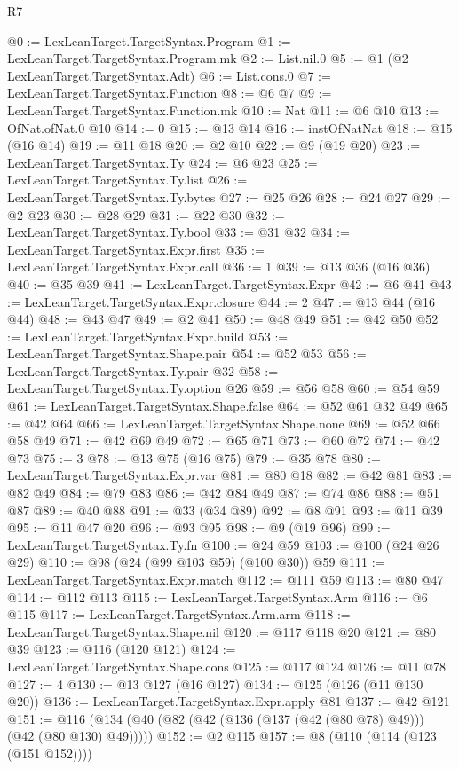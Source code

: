 \begin{lexlean}{R7}
\begin{coremodule}
{{{{{{{{{{{{{@0 := LexLeanTarget.TargetSyntax.Program
@1 := LexLeanTarget.TargetSyntax.Program.mk
@2 := List.nil.{0}
@5 := @1 (@2 LexLeanTarget.TargetSyntax.Adt)
@6 := List.cons.{0}
@7 := LexLeanTarget.TargetSyntax.Function
@8 := @6 @7
@9 := LexLeanTarget.TargetSyntax.Function.mk
@10 := Nat
@11 := @6 @10
@13 := OfNat.ofNat.{0} @10
@14 := 0
@15 := @13 @14
@16 := instOfNatNat
@18 := @15 (@16 @14)
@19 := @11 @18
@20 := @2 @10
@22 := @9 (@19 @20)
@23 := LexLeanTarget.TargetSyntax.Ty
@24 := @6 @23
@25 := LexLeanTarget.TargetSyntax.Ty.list
@26 := LexLeanTarget.TargetSyntax.Ty.bytes
@27 := @25 @26
@28 := @24 @27
@29 := @2 @23
@30 := @28 @29
@31 := @22 @30
@32 := LexLeanTarget.TargetSyntax.Ty.bool
@33 := @31 @32
@34 := LexLeanTarget.TargetSyntax.Expr.first
@35 := LexLeanTarget.TargetSyntax.Expr.call
@36 := 1
@39 := @13 @36 (@16 @36)
@40 := @35 @39
@41 := LexLeanTarget.TargetSyntax.Expr
@42 := @6 @41
@43 := LexLeanTarget.TargetSyntax.Expr.closure
@44 := 2
@47 := @13 @44 (@16 @44)
@48 := @43 @47
@49 := @2 @41
@50 := @48 @49
@51 := @42 @50
@52 := LexLeanTarget.TargetSyntax.Expr.build
@53 := LexLeanTarget.TargetSyntax.Shape.pair
@54 := @52 @53
@56 := LexLeanTarget.TargetSyntax.Ty.pair @32
@58 := LexLeanTarget.TargetSyntax.Ty.option @26
@59 := @56 @58
@60 := @54 @59
@61 := LexLeanTarget.TargetSyntax.Shape.false
@64 := @52 @61 @32 @49
@65 := @42 @64
@66 := LexLeanTarget.TargetSyntax.Shape.none
@69 := @52 @66 @58 @49
@71 := @42 @69 @49
@72 := @65 @71
@73 := @60 @72
@74 := @42 @73
@75 := 3
@78 := @13 @75 (@16 @75)
@79 := @35 @78
@80 := LexLeanTarget.TargetSyntax.Expr.var
@81 := @80 @18
@82 := @42 @81
@83 := @82 @49
@84 := @79 @83
@86 := @42 @84 @49
@87 := @74 @86
@88 := @51 @87
@89 := @40 @88
@91 := @33 (@34 @89)
@92 := @8 @91
@93 := @11 @39
@95 := @11 @47 @20
@96 := @93 @95
@98 := @9 (@19 @96)
@99 := LexLeanTarget.TargetSyntax.Ty.fn
@100 := @24 @59
@103 := @100 (@24 @26 @29)
@110 := @98 (@24 (@99 @103 @59) (@100 @30)) @59
@111 := LexLeanTarget.TargetSyntax.Expr.match
@112 := @111 @59
@113 := @80 @47
@114 := @112 @113
@115 := LexLeanTarget.TargetSyntax.Arm
@116 := @6 @115
@117 := LexLeanTarget.TargetSyntax.Arm.arm
@118 := LexLeanTarget.TargetSyntax.Shape.nil
@120 := @117 @118 @20
@121 := @80 @39
@123 := @116 (@120 @121)
@124 := LexLeanTarget.TargetSyntax.Shape.cons
@125 := @117 @124
@126 := @11 @78
@127 := 4
@130 := @13 @127 (@16 @127)
@134 := @125 (@126 (@11 @130 @20))
@136 := LexLeanTarget.TargetSyntax.Expr.apply @81
@137 := @42 @121
@151 := @116 (@134 (@40 (@82 (@42 (@136 (@137 (@42 (@80 @78) @49))) (@42 (@80 @130) @49)))))
@152 := @2 @115
@157 := @8 (@110 (@114 (@123 (@151 @152))))
}}}}}}}}}}}}}
\end{coremodule}
\end{lexlean}
